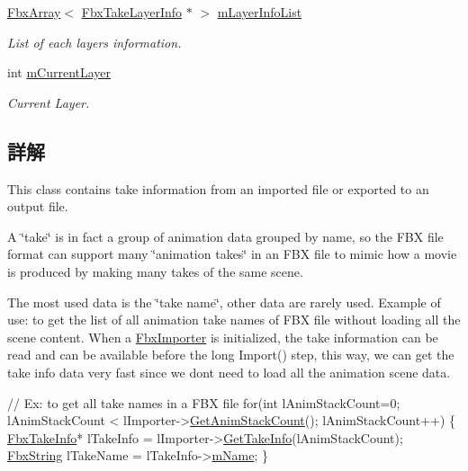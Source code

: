 \begin{DoxyCompactItemize}
\hyperlink{class_fbx_array}{Fbx\+Array}$<$ \hyperlink{struct_fbx_take_layer_info}{Fbx\+Take\+Layer\+Info} $\ast$ $>$ \hyperlink{class_fbx_take_info_a5e71a2f2ecb6d90473d7a2b63c91b175}{m\+Layer\+Info\+List}
\begin{DoxyCompactList}\small\item\em List of each layer\textquotesingle{}s information. \end{DoxyCompactList}\item 
int \hyperlink{class_fbx_take_info_a77d4856b8de2b91d9f84baaa97529240}{m\+Current\+Layer}
\begin{DoxyCompactList}\small\item\em Current Layer. \end{DoxyCompactList}\end{DoxyCompactItemize}


\subsection{詳解}
This class contains take information from an imported file or exported to an output file.

A \char`\"{}take\char`\"{} is in fact a group of animation data grouped by name, so the F\+BX file format can support many \char`\"{}animation takes\char`\"{} in an F\+BX file to mimic how a movie is produced by making many takes of the same scene.

The most used data is the \char`\"{}take name\char`\"{}, other data are rarely used. Example of use\+: to get the list of all animation take names of F\+BX file without loading all the scene content. When a \hyperlink{class_fbx_importer}{Fbx\+Importer} is initialized, the take information can be read and can be available before the long Import() step, this way, we can get the take info data very fast since we don\textquotesingle{}t need to load all the animation scene data. 
\begin{DoxyCode}
\textcolor{comment}{// Ex: to get all take names in a FBX file}
\textcolor{keywordflow}{for}(\textcolor{keywordtype}{int} lAnimStackCount=0; lAnimStackCount < lImporter->\hyperlink{class_fbx_importer_a08165aec1a0ae0ff5f88c5ee8244bd9d}{GetAnimStackCount}(); 
      lAnimStackCount++) 
\{
  \hyperlink{class_fbx_take_info}{FbxTakeInfo}* lTakeInfo = lImporter->\hyperlink{class_fbx_importer_a6733de02d09423cfc5cdabd808954e62}{GetTakeInfo}(lAnimStackCount);
  \hyperlink{class_fbx_string}{FbxString} lTakeName = lTakeInfo->\hyperlink{class_fbx_take_info_ac505b495f047d57eda55340f699f583e}{mName};
\}
\end{DoxyCode}
 

